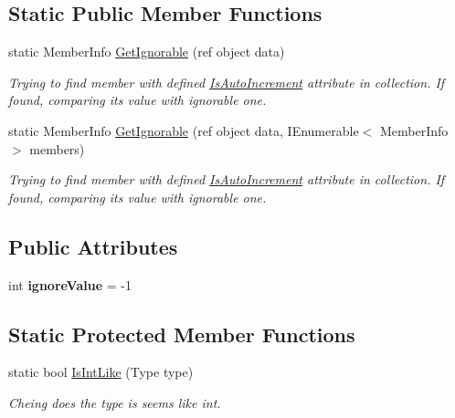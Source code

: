 \subsection*{Static Public Member Functions}
\begin{DoxyCompactItemize}
\item 
static Member\+Info \mbox{\hyperlink{class_uniform_data_operator_1_1_sql_1_1_tables_1_1_attributes_1_1_is_auto_increment_a8f767a4f923f096b67444fda9cb11cc6}{Get\+Ignorable}} (ref object data)
\begin{DoxyCompactList}\small\item\em Trying to find member with defined \mbox{\hyperlink{class_uniform_data_operator_1_1_sql_1_1_tables_1_1_attributes_1_1_is_auto_increment}{Is\+Auto\+Increment}} attribute in collection. If found, comparing it\textquotesingle{}s value with ignorable one. \end{DoxyCompactList}\item 
static Member\+Info \mbox{\hyperlink{class_uniform_data_operator_1_1_sql_1_1_tables_1_1_attributes_1_1_is_auto_increment_aab1ed2315b9ce4939f2a73b2ce43a11d}{Get\+Ignorable}} (ref object data, I\+Enumerable$<$ Member\+Info $>$ members)
\begin{DoxyCompactList}\small\item\em Trying to find member with defined \mbox{\hyperlink{class_uniform_data_operator_1_1_sql_1_1_tables_1_1_attributes_1_1_is_auto_increment}{Is\+Auto\+Increment}} attribute in collection. If found, comparing it\textquotesingle{}s value with ignorable one. \end{DoxyCompactList}\end{DoxyCompactItemize}
\subsection*{Public Attributes}
\begin{DoxyCompactItemize}
\item 
\mbox{\label{class_uniform_data_operator_1_1_sql_1_1_tables_1_1_attributes_1_1_is_auto_increment_af808d2bdb205f0b834aa2f59be329232}} 
int {\bfseries ignore\+Value} = -\/1
\end{DoxyCompactItemize}
\subsection*{Static Protected Member Functions}
\begin{DoxyCompactItemize}
\item 
static bool \mbox{\hyperlink{class_uniform_data_operator_1_1_sql_1_1_tables_1_1_attributes_1_1_is_auto_increment_a23347282e6b351289251b4cbfd438f51}{Is\+Int\+Like}} (Type type)
\begin{DoxyCompactList}\small\item\em Cheing does the type is seems like int. \end{DoxyCompactList}\end{DoxyCompactItemize}


